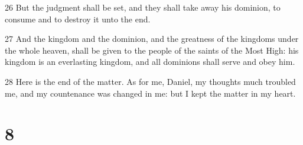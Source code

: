 \par 26 But the judgment shall be set, and they shall take away his dominion, to consume and to destroy it unto the end.
\par 27 And the kingdom and the dominion, and the greatness of the kingdoms under the whole heaven, shall be given to the people of the saints of the Most High: his kingdom is an everlasting kingdom, and all dominions shall serve and obey him.
\par 28 Here is the end of the matter. As for me, Daniel, my thoughts much troubled me, and my countenance was changed in me: but I kept the matter in my heart.

\chapter{8}

